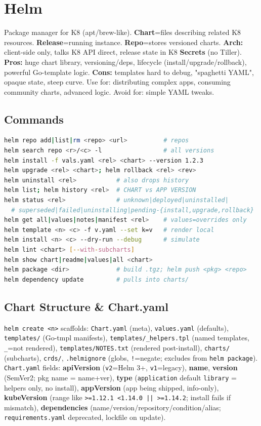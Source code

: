 \renewcommand{\chapcolor}{chHelm}
\section{Helm}
Package manager for K8 (apt/brew-like). \textbf{Chart}=files describing related K8 resources. \textbf{Release}=running instance. \textbf{Repo}=stores versioned charts. \textbf{Arch:} client-side only, talks K8 API direct, release state in K8 \textbf{Secrets} (no Tiller). \textbf{Pros:} huge chart library, versioning/deps, lifecycle (install/upgrade/rollback), powerful Go-template logic. \textbf{Cons:} templates hard to debug, "spaghetti YAML", opaque state, steep curve. Use for: distributing complex apps, consuming community charts, advanced logic. Avoid for: simple YAML tweaks.

\subsection{Commands}
\begin{lstlisting}[language=sh]
helm repo add|list|rm <repo> <url>          # repos
helm search repo <r>/<c> -l                 # all versions
helm install -f vals.yaml <rel> <chart> --version 1.2.3
helm upgrade <rel> <chart>; helm rollback <rel> <rev>
helm uninstall <rel>           # also drops history
helm list; helm history <rel>  # CHART vs APP VERSION
helm status <rel>              # unknown|deployed|uninstalled|
  # superseded|failed|uninstalling|pending-{install,upgrade,rollback}
helm get all|values|notes|manifest <rel>    # values=overrides only
helm template <n> <c> -f v.yaml --set k=v   # render local
helm install <n> <c> --dry-run --debug      # simulate
helm lint <chart> [--with-subcharts]
helm show chart|readme|values|all <chart>
helm package <dir>             # build .tgz; helm push <pkg> <repo>
helm dependency update         # pulls into charts/
\end{lstlisting}

\subsection{Chart Structure \& Chart.yaml}
\texttt{helm create <n>} scaffolds: \texttt{Chart.yaml} (meta), \texttt{values.yaml} (defaults), \texttt{templates/} (Go-tmpl manifests), \texttt{templates/\_helpers.tpl} (named templates, \texttt{\_}=not rendered), \texttt{templates/NOTES.txt} (rendered post-install), \texttt{charts/} (subcharts), \texttt{crds/}, \texttt{.helmignore} (globs, \texttt{!}=negate; excludes from \texttt{helm package}).\\
\texttt{Chart.yaml} fields: \textbf{apiVersion} (\texttt{v2}=Helm 3+, \texttt{v1}=legacy), \textbf{name}, \textbf{version} (SemVer2; pkg name = name+ver), \textbf{type} (\texttt{application} default \textbar{} \texttt{library} = helpers only, no install), \textbf{appVersion} (app being shipped, info-only), \textbf{kubeVersion} (range like \texttt{>=1.12.1 <1.14.0 || >=1.14.2}; install fails if mismatch), \textbf{dependencies} (name/version/repository/condition/alias; \texttt{requirements.yaml} deprecated, lockfile on update).

